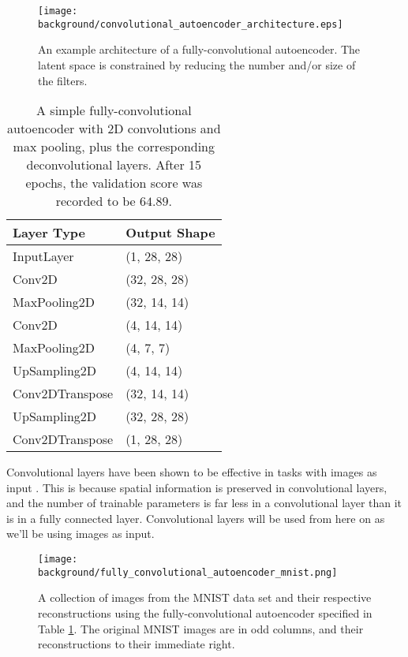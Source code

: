 \begin{figure}[h!]
\centering
\captionsetup{justification=centering}
\texttt{[image: background/convolutional\_autoencoder\_architecture.eps]}
\caption{An example architecture of a fully-convolutional autoencoder. The latent space is constrained by reducing the number and/or size of the filters.}
\label{fig:convolutional_autoencoder_architecture}
\end{figure}

\vspace{8mm}

\begin{table}[h!]
\centering
\captionsetup{justification=centering}
\begin{tabular}{@{}ll@{}}
\toprule
\textbf{Layer Type} & \textbf{Output Shape} \\ \midrule
InputLayer & (1, 28, 28) \\
Conv2D & (32, 28, 28) \\
MaxPooling2D & (32, 14, 14) \\
Conv2D & (4, 14, 14) \\
MaxPooling2D & (4, 7, 7) \\
UpSampling2D & (4, 14, 14) \\
Conv2DTranspose & (32, 14, 14) \\
UpSampling2D & (32, 28, 28) \\
Conv2DTranspose & (1, 28, 28) \\ \bottomrule
\end{tabular}
\caption{A simple fully-convolutional autoencoder with 2D convolutions and max pooling, plus the corresponding deconvolutional layers. After 15 epochs, the validation score was recorded to be $64.89$.}
\label{tab:convolutional_autoencoder_architecture}
\end{table}

Convolutional layers have been shown to be effective in tasks with images as input \cite{Krizhevsky2012, Zeiler2014, Szegedy2015}. This is because spatial information is preserved in convolutional layers, and the number of trainable parameters is far less in a convolutional layer than it is in a fully connected layer. Convolutional layers will be used from here on as we'll be using images as input.

\newpage
\begin{figure}[H]
\centering
\captionsetup{justification=centering}
\texttt{[image: background/fully\_convolutional\_autoencoder\_mnist.png]}
\caption{A collection of images from the MNIST data set and their respective reconstructions using the fully-convolutional autoencoder specified in Table \ref{tab:convolutional_autoencoder_architecture}. The original MNIST images are in odd columns, and their reconstructions to their immediate right.}
\label{fig:convolutional_autoencoder_mnist}
\end{figure}


